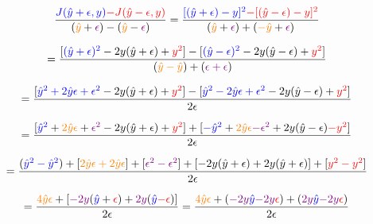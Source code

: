 \documentclass{article}
\begin{document}
\begin{displaymath}
\frac{\textcolor{blue}{J(\hat{y}+\epsilon, y)}
\textcolor{red}{-J(\hat{y}-\epsilon, y)}}
{(\textcolor{orange}{\hat{y}}+\textcolor{violet}{\epsilon})-(
\textcolor{orange}{\hat{y}}-\textcolor{violet}{\epsilon})}
=\frac{\textcolor{blue}{[(\hat{y}+\epsilon)-y]^2}
\textcolor{red}{-[(\hat{y}-\epsilon)-y]^2}}
{(\textcolor{orange}{\hat{y}}+\textcolor{violet}{\epsilon})+(
\textcolor{orange}{-\hat{y}}+\textcolor{violet}{\epsilon})}
\end{displaymath}

\begin{displaymath}
=\frac{[\textcolor{blue}{(\hat{y}+\epsilon)^2}-2y(\hat{y}+\epsilon)+
\textcolor{red}{y^2}]-[\textcolor{blue}{(\hat{y}-\epsilon)^2}
-2y(\hat{y}-\epsilon)+\textcolor{red}{y^2}]}
{(\textcolor{orange}{\hat{y}-\hat{y}})+(\textcolor{violet}{\epsilon+\epsilon})}
\end{displaymath}

\begin{displaymath}
=\frac{[\textcolor{blue}{\hat{y}^2+2\hat{y}\epsilon+\epsilon^2}
-2y(\hat{y}+\epsilon)+\textcolor{red}{y^2}]-
[\textcolor{blue}{\hat{y}^2-2\hat{y}\epsilon+\epsilon^2}
-2y(\hat{y}-\epsilon)+\textcolor{red}{y^2}]}
{2\epsilon}
\end{displaymath}

\begin{displaymath}
=\frac{[\textcolor{blue}{\hat{y}^2}+\textcolor{orange}{2\hat{y}\epsilon}
+\textcolor{violet}{\epsilon^2}-2y(\hat{y}+\epsilon)+\textcolor{red}{y^2}]+
[\textcolor{blue}{-\hat{y}^2}+\textcolor{orange}{2\hat{y}\epsilon}
\textcolor{violet}{-\epsilon^2}+2y(\hat{y}-\epsilon)\textcolor{red}{-y^2}]}
{2\epsilon}
\end{displaymath}

\begin{displaymath}
=\frac{(\textcolor{blue}{\hat{y}^2-\hat{y}^2})+[
\textcolor{orange}{2\hat{y}\epsilon+2\hat{y}\epsilon}]+[
\textcolor{violet}{\epsilon^2-\epsilon^2}]+[
-2y(\hat{y}+\epsilon)+2y(\hat{y}+\epsilon)]+[\textcolor{red}{y^2-y^2}]}
{2\epsilon}
\end{displaymath}

\begin{displaymath}
=\frac{\textcolor{orange}{4\hat{y}\epsilon}+[\textcolor{violet}{-2y}
(\textcolor{blue}{\hat{y}}+\textcolor{red}{\epsilon})+\textcolor{violet}
{2y}(\textcolor{blue}{\hat{y}}\textcolor{red}{-\epsilon})]}
{2\epsilon}
=\frac{\textcolor{orange}{4\hat{y}\epsilon}+(\textcolor{violet}{-2y}
\textcolor{blue}{\hat{y}}\textcolor{violet}{-2y}
\textcolor{red}{\epsilon})+(\textcolor{violet}{2y}
\textcolor{blue}{\hat{y}}\textcolor{violet}{-2y}
\textcolor{red}{\epsilon})}{2\epsilon}
\end{displaymath}
\end{document}
